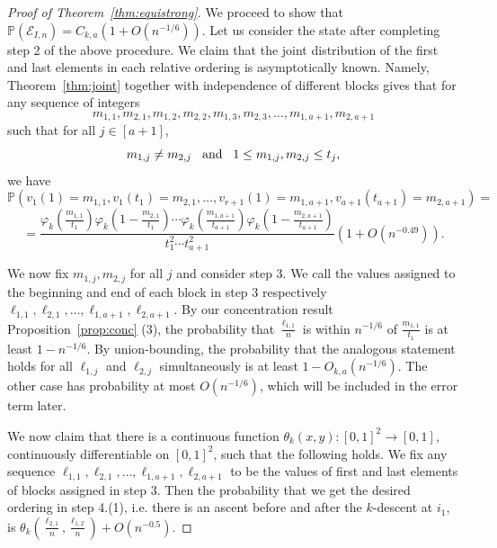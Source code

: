 \documentclass{amsart}
\theoremstyle{definition}
\begin{document}
\begin{proof}[Proof of Theorem~\ref{thm:equistrong}]
We proceed to show that $\mathbb{P}(\mathcal{E}_{I,n})=C_{k,a}\left(1+O\left(n^{-1/6}\right)\right)$. Let us consider the state after completing step 2 of the above procedure. We claim that the joint distribution of the first and last elements in each relative ordering is asymptotically known. Namely, Theorem~\ref{thm:joint} together with independence of different blocks gives that for any sequence of integers \[m_{1,1},m_{2,1},m_{1,2},m_{2,2},m_{1,3},m_{2,3},\ldots, m_{1,a+1},m_{2,a+1}\]
such that for all $j\in [a+1]$,
\[m_{1,j}\neq m_{2,j} \hspace{3mm}\text{and}\hspace{3mm}1\leq m_{1,j},m_{2,j}\leq t_j,\]
we have
\[\mathbb{P}\left(v_1(1)=m_{1,1}, v_1(t_1)=m_{2,1},\ldots, v_{r+1}(1)=m_{1,a+1},v_{a+1}(t_{a+1})=m_{2,a+1}\right)=\]
\[=\frac{\varphi_k\left(\frac{m_{1,1}}{t_1}\right)\varphi_k\left(1-\frac{m_{2,1}}{t_1}\right)\cdots\varphi_k\left(\frac{m_{1,a+1}}{t_{a+1}}\right)\varphi_k\left(1-\frac{m_{2,a+1}}{t_{a+1}}\right)}{t_1^2\cdots t_{a+1}^2}\left(1+O\left(n^{-0.49}\right)\right).\]

We now fix $m_{1,j},m_{2,j}$ for all $j$ and consider step 3. We call the values assigned to the beginning and end of each block in step 3 respectively $\ell_{1,1},\ell_{2,1}, \ldots, \ell_{1,a+1},\ell_{2,a+1}$. By our concentration result Proposition~\ref{prop:conc} (3), the probability that $\frac{\ell_{1,1}}{n}$ is within $n^{-1/6}$ of $\frac{m_{1,1}}{t_1}$ is at least $1-n^{-1/6}$. By union-bounding, the probability that the analogous statement holds for all $\ell_{1,j}$ and $\ell_{2,j}$ simultaneously is at least $1-O_{k,a}\left(n^{-1/6}\right)$. The other case has probability at most $O\left(n^{-1/6}\right)$, which will be included in the error term later.


We now claim that there is a continuous function $\theta_k(x,y)\colon [0,1]^2\to [0,1]$, continuously differentiable on $[0,1]^2$, such that the following holds. We fix any sequence $\ell_{1,1},\ell_{2,1}, \ldots, \ell_{1,a+1},\ell_{2,a+1}$ to be the values of first and last elements of blocks assigned in step 3.  Then the probability that we get the desired ordering in step 4.(1), i.e. there is an ascent before and after the $k$-descent at $i_1$, is $\theta_k\left(\frac{\ell_{2,1}}{n},\frac{\ell_{1,2}}{n}\right)+O\left(n^{-0.5}\right)$.


\end{proof}
\end{document}
